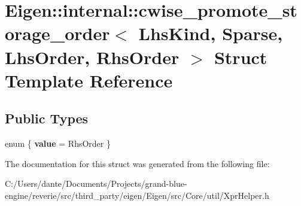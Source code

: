 \hypertarget{struct_eigen_1_1internal_1_1cwise__promote__storage__order_3_01_lhs_kind_00_01_sparse_00_01_lhs_order_00_01_rhs_order_01_4}{}\section{Eigen\+::internal\+::cwise\+\_\+promote\+\_\+storage\+\_\+order$<$ Lhs\+Kind, Sparse, Lhs\+Order, Rhs\+Order $>$ Struct Template Reference}
\label{struct_eigen_1_1internal_1_1cwise__promote__storage__order_3_01_lhs_kind_00_01_sparse_00_01_lhs_order_00_01_rhs_order_01_4}
\subsection*{Public Types}
\begin{DoxyCompactItemize}
\item 
\mbox{\label{struct_eigen_1_1internal_1_1cwise__promote__storage__order_3_01_lhs_kind_00_01_sparse_00_01_lhs_order_00_01_rhs_order_01_4_ac822c653d76cc9aa9301f50c1bef6c89}} 
enum \{ {\bfseries value} = Rhs\+Order
 \}
\end{DoxyCompactItemize}


The documentation for this struct was generated from the following file\+:\begin{DoxyCompactItemize}
\item 
C\+:/\+Users/dante/\+Documents/\+Projects/grand-\/blue-\/engine/reverie/src/third\+\_\+party/eigen/\+Eigen/src/\+Core/util/Xpr\+Helper.\+h\end{DoxyCompactItemize}
